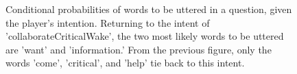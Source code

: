 \begin{figure}[h!]
    \centering
    \caption{Conditional probabilities of words to be uttered in a question, given the player's intention. Returning to the intent of 'collaborateCriticalWake', the two most likely words to be uttered are 'want' and 'information.' From the previous figure, only the words 'come', 'critical', and 'help' tie back to this intent.}
    \end{figure}
 
    
     






